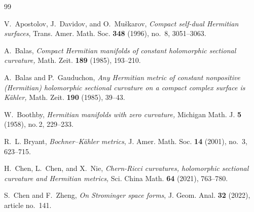 \documentclass{amsart}
\numberwithin{equation}{section}
\begin{document}
\begin{thebibliography}{99}




V.~Apostolov, J.~Davidov, and O.~Mu\v{s}karov,
\emph{Compact self-dual Hermitian surfaces}, Trans. Amer. Math. Soc. \textbf{348} (1996), no.~8, 3051--3063.

 A.~Balas, \emph{Compact Hermitian manifolds of constant holomorphic sectional curvature,} Math. Zeit. {\bf 189} (1985),  193--210.

 A.~Balas and P.~Gauduchon, \emph{Any Hermitian metric of constant nonpositive (Hermitian) holomorphic sectional curvature on a compact complex surface is K\"ahler,} Math. Zeit. {\bf 190} (1985), 39--43.




 W.~Boothby, \emph{Hermitian manifolds with zero curvature,} Michigan Math. J. {\bf 5} (1958), no.\,2, 229--233.

 R.~L. Bryant, \emph{Bochner--K\"ahler metrics},
J. Amer. Math. Soc. \textbf{14} (2001), no.~3, 623--715.

  H.~Chen, L.~Chen, and X.~Nie, \emph{Chern-Ricci curvatures, holomorphic sectional curvature and  Hermitian metrics,}  Sci. China Math. {\bf 64} (2021), 763--780.


 S.~Chen and F.~Zheng, \emph{On Strominger space forms},
J. Geom. Anal. \textbf{32} (2022), article no.~141.




\end{thebibliography}
\end{document}
